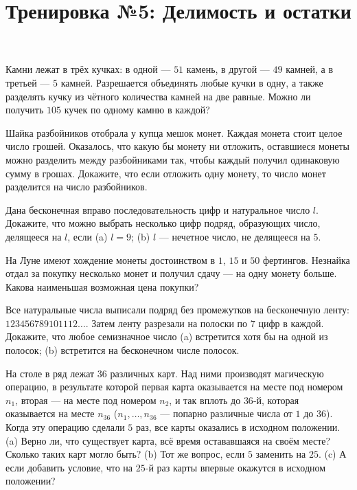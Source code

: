 



\title{Тренировка №5: Делимость и остатки}
\maketitle

\begin{problem}
	Камни лежат в трёх кучках: в одной --- $51$ камень, в другой --- $49$ камней, а в третьей --- $5$ камней. Разрешается объединять любые кучки в одну, а также разделять кучку из чётного количества камней на две равные. Можно ли получить $105$ кучек по одному камню в каждой?
\end{problem}

\begin{problem}
	Шайка разбойников отобрала у купца мешок монет. Каждая монета стоит целое число грошей. Оказалось, что какую бы монету ни отложить, оставшиеся монеты можно разделить между разбойниками так, чтобы каждый получил одинаковую сумму в грошах. Докажите, что если отложить одну монету, то число монет разделится на число разбойников.
\end{problem}

\begin{problem}
	Дана бесконечная вправо последовательность цифр и натуральное число $l$. Докажите, что можно выбрать несколько цифр подряд, образующих число, делящееся на $l$, если (a) $l = 9$; (b) $l$ --- нечетное число, не делящееся на $5$.
\end{problem}

\begin{problem}
	На Луне имеют хождение монеты достоинством в $1$, $15$ и $50$ фертингов. Незнайка отдал за покупку несколько монет и получил сдачу --- на одну монету больше. Какова наименьшая возможная цена покупки?
\end{problem}

\begin{problem}
	Все натуральные числа выписали подряд без промежутков на бесконечную ленту: $123456789101112\ldots$. Затем ленту разрезали на полоски по $7$ цифр в каждой. Докажите, что любое семизначное число (a) встретится хотя бы на одной из полосок; (b) встретится на бесконечном числе полосок.
\end{problem}

\begin{problem}
	На столе в ряд лежат $36$ различных карт. Над ними производят магическую операцию, в результате которой первая карта оказывается на месте под номером $n_1$, вторая --- на месте под номером $n_2$, и так вплоть до $36$-й, которая оказывается на месте $n_{36}$ ($n_1, \ldots, n_{36}$ --- попарно различные числа от $1$ до $36$). Когда эту операцию сделали $5$ раз, все карты оказались в исходном положении. (a) Верно ли, что существует карта, всё время остававшаяся на своём месте? Сколько таких карт могло быть? (b) Тот же вопрос, если $5$ заменить на $25$. (c) А если добавить условие, что на $25$-й раз карты впервые окажутся в исходном положении?
\end{problem}

